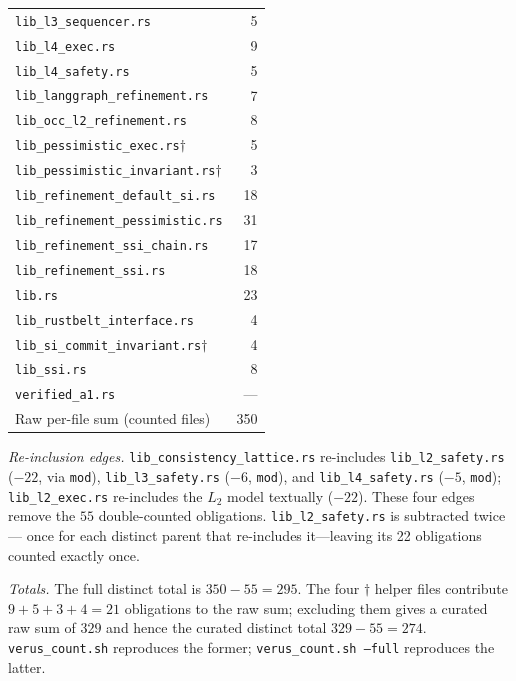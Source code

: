 \documentclass[journal,compsoc,10pt]{IEEEtran}
\theoremstyle{definition}
\theoremstyle{remark}
\begin{document}
\begin{table}[t]
\begin{tabular}{@{}lr@{}}
\texttt{lib\_l3\_sequencer.rs}                   & 5  \\
\texttt{lib\_l4\_exec.rs}                        & 9  \\
\texttt{lib\_l4\_safety.rs}                      & 5  \\
\texttt{lib\_langgraph\_refinement.rs}           & 7  \\
\texttt{lib\_occ\_l2\_refinement.rs}             & 8  \\
\texttt{lib\_pessimistic\_exec.rs}$\dagger$      & 5  \\
\texttt{lib\_pessimistic\_invariant.rs}$\dagger$ & 3  \\
\texttt{lib\_refinement\_default\_si.rs}         & 18 \\
\texttt{lib\_refinement\_pessimistic.rs}         & 31 \\
\texttt{lib\_refinement\_ssi\_chain.rs}          & 17 \\
\texttt{lib\_refinement\_ssi.rs}                 & 18 \\
\texttt{lib.rs}                                  & 23 \\
\texttt{lib\_rustbelt\_interface.rs}             & 4  \\
\texttt{lib\_si\_commit\_invariant.rs}$\dagger$  & 4  \\
\texttt{lib\_ssi.rs}                             & 8  \\
\texttt{verified\_a1.rs}                         & --- \\
\midrule
Raw per-file sum (counted files)                 & 350 \\
\bottomrule
\end{tabular}
\end{table}

\emph{Re-inclusion edges.} \texttt{lib\_consistency\_lattice.rs} re-includes
\texttt{lib\_l2\_safety.rs} ($-22$, via \texttt{mod}),
\texttt{lib\_l3\_safety.rs} ($-6$, \texttt{mod}), and
\texttt{lib\_l4\_safety.rs} ($-5$, \texttt{mod}); \texttt{lib\_l2\_exec.rs}
re-includes the $L_2$ model textually ($-22$). These four edges remove the $55$
double-counted obligations. \texttt{lib\_l2\_safety.rs} is subtracted twice---
once for each distinct parent that re-includes it---leaving its 22 obligations
counted exactly once.

\emph{Totals.} The full distinct total is $350 - 55 = 295$. The four
$\dagger$ helper files contribute $9 + 5 + 3 + 4 = 21$ obligations to the raw
sum; excluding them gives a curated raw sum of $329$ and hence the curated
distinct total $329 - 55 = 274$. \texttt{verus\_count.sh} reproduces the
former; \texttt{verus\_count.sh --full} reproduces the latter.
\end{document}
